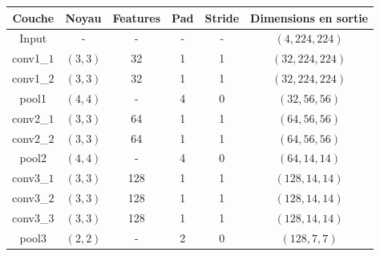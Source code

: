 \documentclass[a4paper, 11pt]{report}
\begin{document}
\begin{center}
\begin{tabular}{|c|c|c|c|c|c|c|c|c|c|c|}
\hline 
Couche & \multicolumn{2}{c|}{Noyau} & \multicolumn{2}{c|}{Features} & \multicolumn{2}{c|}{Pad} & \multicolumn{2}{c|}{Stride} & \multicolumn{2}{c|}{Dimensions en sortie}\\ 
\hline 
Input & \multicolumn{2}{c|}{-} & \multicolumn{2}{c|}{-} & \multicolumn{2}{c|}{-} & \multicolumn{2}{c|}{-} & \multicolumn{2}{c|}{$(4, 224, 224)$}\\ 
\hline 
conv1\_$1$ & \multicolumn{2}{c|}{$(3, 3)$} & \multicolumn{2}{c|}{32} & \multicolumn{2}{c|}{1} & \multicolumn{2}{c|}{1} & \multicolumn{2}{c|}{$(32, 224, 224)$}\\ 
\hline
conv1\_$2$ & \multicolumn{2}{c|}{$(3, 3)$} & \multicolumn{2}{c|}{32} & \multicolumn{2}{c|}{1} & \multicolumn{2}{c|}{1} & \multicolumn{2}{c|}{$(32, 224, 224)$}\\ 
\hline 
pool1 & \multicolumn{2}{c|}{$(4, 4)$} & \multicolumn{2}{c|}{-} & \multicolumn{2}{c|}{4} & \multicolumn{2}{c|}{0} & \multicolumn{2}{c|}{$(32, 56, 56)$}\\ 
\hline 
conv2\_$1$ & \multicolumn{2}{c|}{$(3, 3)$} & \multicolumn{2}{c|}{64} & \multicolumn{2}{c|}{1} & \multicolumn{2}{c|}{1} & \multicolumn{2}{c|}{$(64, 56, 56)$}\\ 
\hline
conv2\_$2$ & \multicolumn{2}{c|}{$(3, 3)$} & \multicolumn{2}{c|}{64} & \multicolumn{2}{c|}{1} & \multicolumn{2}{c|}{1} & \multicolumn{2}{c|}{$(64, 56, 56)$}\\ 
\hline 
pool2 & \multicolumn{2}{c|}{$(4, 4)$} & \multicolumn{2}{c|}{-} & \multicolumn{2}{c|}{4} & \multicolumn{2}{c|}{0} & \multicolumn{2}{c|}{$(64, 14, 14)$}\\ 
\hline 
conv3\_$1$ & \multicolumn{2}{c|}{$(3, 3)$} & \multicolumn{2}{c|}{128} & \multicolumn{2}{c|}{1} & \multicolumn{2}{c|}{1} & \multicolumn{2}{c|}{$(128, 14, 14)$}\\ 
\hline
conv3\_$2$ & \multicolumn{2}{c|}{$(3, 3)$} & \multicolumn{2}{c|}{128} & \multicolumn{2}{c|}{1} & \multicolumn{2}{c|}{1} & \multicolumn{2}{c|}{$(128, 14, 14)$}\\ 
\hline
conv3\_$3$ & \multicolumn{2}{c|}{$(3, 3)$} & \multicolumn{2}{c|}{128} & \multicolumn{2}{c|}{1} & \multicolumn{2}{c|}{1} & \multicolumn{2}{c|}{$(128, 14, 14)$}\\ 
\hline 
pool3 & \multicolumn{2}{c|}{$(2, 2)$} & \multicolumn{2}{c|}{-} & \multicolumn{2}{c|}{2} & \multicolumn{2}{c|}{0} & \multicolumn{2}{c|}{$(128, 7, 7)$}\\ 

\end{tabular}
\end{center}
\end{document}
